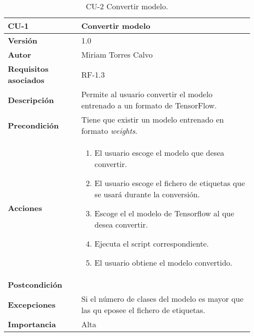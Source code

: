 \begin{table}[p]
  \centering
  \begin{tabularx}{\linewidth}{ p{} p{} }
  \toprule
  \textbf{CU-1} & \textbf{Convertir modelo}\\
  \toprule
  \textbf{Versión} & 1.0\\
  \textbf{Autor} & Miriam Torres Calvo\\
  \textbf{Requisitos asociados} & RF-1.3\\
  \textbf{Descripción} & Permite al usuario convertir el modelo entrenado a un formato de TensorFlow.\\
  \textbf{Precondición} & Tiene que existir un modelo entrenado en formato \textit{weights}.\\
  \textbf{Acciones} &
  \begin{enumerate}
  \def\labelenumi{\arabic{enumi}.}
  \tightlist
  \item El usuario escoge el modelo que desea convertir.
  \item El usuario escoge el fichero de etiquetas que se usará durante la conversión.
  \item Escoge el el modelo de Tensorflow al que desea convertir.
  \item Ejecuta el script correspondiente.
  \item El usuario obtiene el modelo convertido.
  \end{enumerate}\\
  \textbf{Postcondición} & \\
  \textbf{Excepciones} & Si el número de clases del modelo es mayor que las qu eposee el fichero de etiquetas.\\
  \textbf{Importancia} & Alta \\
  \bottomrule
  \end{tabularx}
  \caption{CU-2 Convertir modelo.}
\end{table}

